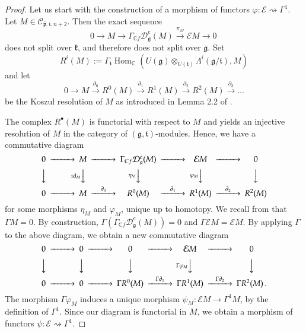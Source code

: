 \documentclass{tglat2e}
\theoremstyle{definition}
\theoremstyle{remark}
\renewcommand{\tt}{\mathfrak{t}}
\newcommand{\kk}{\mathfrak{k}}
\newcommand{\pp}{\mathfrak{p}}
\renewcommand{\gg}{\mathfrak{g}}
\DeclareMathOperator{\Hom}{Hom}
\begin{document}
\begin{proof} Let us start with the construction of a morphism of functors $\varphi:\mathcal E\rightsquigarrow\Gamma^1$. Let $M\in \mathcal{C}_{\bar{\pp},\tt,n+2}$.
Then the exact sequence 
\begin{equation*}\label{sequence}
			0\to M\to \Gamma_{\mathbb Cf}\mathcal D^e_\gg(M) \overset{\pi_M}{\longrightarrow} \mathcal EM\to 0\,
		\end{equation*}
does not split over $\kk$, and therefore does not split over $\gg$.  Set 
$$ R^i(M):=\Gamma_\tt\Hom_{\mathbb C}\left(U(\gg)\otimes_{U(\tt)}\Lambda^i(\gg/\tt),M\right)$$  and let 
$$0\to M \xrightarrow{\partial_0} R^0(M)\xrightarrow{\partial_1} R^1(M)\xrightarrow{\partial_2} R^2(M)\xrightarrow{\partial_3}\dots$$
be the Koszul resolution of $M$ as introduced in Lemma 2.2 of \cite{Z}.

The complex $R^\bullet(M)$ is functorial with respect to $M$ and yields an injective resolution of $M$ in the category of $(\gg,\tt)$-modules.  Hence, we have a commutative diagram
\begin{equation*}
\begin{CD}
0@>>> M @>>>\Gamma_{\mathbb Cf}\mathcal D^e_\gg(M) @>>>\mathcal EM @>>>0\\
@VVV @V\operatorname{id}_MVV @V\eta_MVV @V\varphi_MVV@VVV\\
0@>>>M @>\partial_0>>R^0(M) @>\partial_1>>R^1(M)@>\partial_2>>R^2(M)
\end{CD}\notag
\end{equation*}
for some morphisms $\eta_M$ and $\varphi_M$, unique up to homotopy.  We recall from \cite{PZ5} that $\Gamma M=0$.  By construction, $\Gamma\left( \Gamma_{\mathbb Cf}\mathcal D^e_\gg(M)\right)=0$ and $\Gamma\mathcal{E}M=\mathcal{E}M$.  By applying $\Gamma$ to the above diagram, we obtain a new commutative diagram
\begin{equation*}
\begin{CD}
0@>>>0@>>>0@>>> \mathcal EM @>>>0\\
@VVV @VVV @VVV @V\Gamma\varphi_MVV @VVV\\
0@>>>0@>>> \Gamma R^0(M) @>\Gamma\partial_1>>\Gamma R^1(M) @>\Gamma\partial_2>>\Gamma R^2(M)\,.
\end{CD}\notag
\end{equation*}
The morphism $\Gamma\varphi_M$ induces a unique morphism $\psi_M:\mathcal{E}M\to\Gamma^1M$, by the definition of $\Gamma^1$.  Since our diagram is functorial in $M$, we obtain a morphism of functors $\psi:\mathcal{E}\rightsquigarrow\Gamma^1$.


\end{proof}
\end{document}
